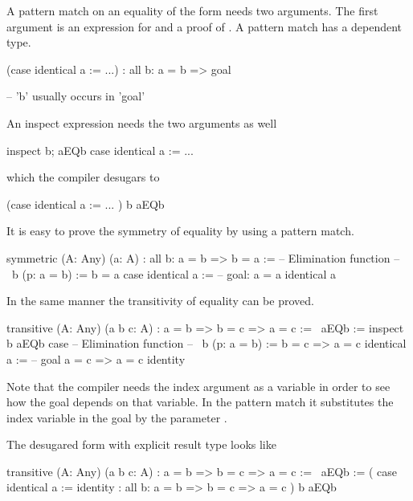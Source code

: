 A pattern match on an equality of the form  needs two arguments. The
first argument is an expression for  and a proof of . A
pattern match has a dependent type.

\begin{alba}
    (case identical a := ...)
    : all b: a = b => goal

    -- 'b' usually occurs in 'goal'
\end{alba}

An inspect expression needs the two arguments as well
%
\begin{alba}
    inspect
        b; aEQb
    case
        identical a := ...
\end{alba}
%
which the compiler desugars to
\begin{alba}
    (case
        identical a := ...
    )
        b aEQb
\end{alba}



It is easy to prove the symmetry of equality by using a pattern match.
\begin{alba}
    symmetric
        (A: Any) (a: A)
        : all b: a = b => b = a
    :=
        -- Elimination function
        -- \ b (p: a = b) := b = a
        case
            identical a :=
                    -- goal: a = a
                identical a
\end{alba}

In the same manner the transitivity of equality can be proved.
\begin{alba}
    transitive
        (A: Any) (a b c: A)
        : a = b => b = c => a = c
    :=
        \ aEQb :=
            inspect
                b aEQb
            case
                -- Elimination function
                -- \ b (p: a = b) := b = c => a = c
                identical a :=
                        -- goal a = c => a = c
                    identity
\end{alba}
%
Note that the compiler needs the index argument as a variable in order to see
how the goal depends on that variable. In the pattern match it substitutes the
index variable  in the goal by the parameter .

\noindent The desugared form with explicit result type looks like
\begin{alba}
    transitive
        (A: Any) (a b c: A)
        : a = b => b = c => a = c
    :=
        \ aEQb :=
            (
                case
                    identical a := identity
                : all b: a = b => b = c => a = c
            )
                b
                aEQb
\end{alba}



